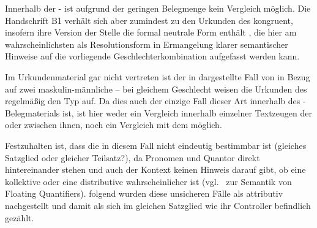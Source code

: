 Innerhalb der \KC{}- ist aufgrund der geringen Belegmenge kein
Vergleich möglich. Die Handschrift B1 verhält sich aber zumindest zu den
Urkunden des \CAO{} kongruent, insofern ihre Version der Stelle die
formal neutrale Form  enthält
, die hier am wahrscheinlichsten als Resolutionsform in
Ermangelung klarer semantischer Hinweise auf die vorliegende
Geschlechterkombination aufgefasst werden kann.

Im Urkundenmaterial gar nicht vertreten ist der in 
dargestellte Fall von  in Bezug auf zwei maskulin-männliche
 -- bei gleichem Geschlecht weisen die Urkunden des
\CAO{} regelmäßig den Typ  auf. Da dies auch der einzige Fall
dieser Art innerhalb des \KC{}-Belegmaterials ist, ist hier weder ein Vergleich
innerhalb einzelner Textzeugen der \KC{} oder zwischen ihnen, noch ein
Vergleich mit dem \CAO{} möglich.

\begin{exe}
\end{exe}

Festzuhalten ist, dass die  in diesem Fall nicht
eindeutig bestimmbar ist (gleiches Satzglied oder gleicher
Teilsatz?), da Pronomen und Quantor direkt hintereinander stehen und auch der
Kontext keinen Hinweis darauf gibt, ob eine kollektive oder eine
distributive  wahrscheinlicher ist (vgl.~
zur Semantik von Floating Quantifiers).
\citet[623]{ksw2} folgend wurden diese unsicheren Fälle als
attributiv nachgestellt und damit als sich im gleichen Satzglied
wie ihr Controller befindlich gezählt.

